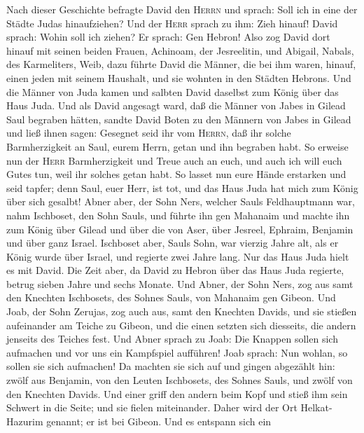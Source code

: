  Nach dieser Geschichte befragte David den \textsc{Herrn}
und sprach: Soll ich in eine der Städte Judas hinaufziehen? Und der
\textsc{Herr} sprach zu ihm: Zieh hinauf! David sprach: Wohin soll ich
ziehen? Er sprach: Gen Hebron!  Also zog David dort hinauf
mit seinen beiden Frauen, Achinoam, der Jesreelitin, und Abigail,
Nabals, des Karmeliters, Weib,  dazu führte David die
Männer, die bei ihm waren, hinauf, einen jeden mit seinem Haushalt, und
sie wohnten in den Städten Hebrons.  Und die Männer von
Juda kamen und salbten David daselbst zum König über das Haus Juda.
 Und als David angesagt ward, daß die Männer von Jabes in
Gilead Saul begraben hätten, sandte David Boten zu den Männern von Jabes
in Gilead und ließ ihnen sagen: Gesegnet seid ihr vom \textsc{Herrn},
daß ihr solche Barmherzigkeit an Saul, eurem Herrn, getan und ihn
begraben habt.  So erweise nun der \textsc{Herr}
Barmherzigkeit und Treue auch an euch, und auch ich will euch Gutes tun,
weil ihr solches getan habt.  So lasset nun eure Hände
erstarken und seid tapfer; denn Saul, euer Herr, ist tot, und das Haus
Juda hat mich zum König über sich gesalbt!  Abner aber,
der Sohn Ners, welcher Sauls Feldhauptmann war, nahm Ischboset, den Sohn
Sauls, und führte ihn gen Mahanaim  und machte ihn zum
König über Gilead und über die von Aser, über Jesreel, Ephraim, Benjamin
und über ganz Israel.  Ischboset aber, Sauls Sohn, war
vierzig Jahre alt, als er König wurde über Israel, und regierte zwei
Jahre lang. Nur das Haus Juda hielt es mit David.  Die
Zeit aber, da David zu Hebron über das Haus Juda regierte, betrug sieben
Jahre und sechs Monate.  Und Abner, der Sohn Ners, zog
aus samt den Knechten Ischbosets, des Sohnes Sauls, von Mahanaim gen
Gibeon.  Und Joab, der Sohn Zerujas, zog auch aus, samt
den Knechten Davids, und sie stießen aufeinander am Teiche zu Gibeon,
und die einen setzten sich diesseits, die andern jenseits des Teiches
fest.  Und Abner sprach zu Joab: Die Knappen sollen sich
aufmachen und vor uns ein Kampfspiel aufführen! Joab sprach: Nun wohlan,
so sollen sie sich aufmachen!  Da machten sie sich auf
und gingen abgezählt hin: zwölf aus Benjamin, von den Leuten Ischbosets,
des Sohnes Sauls, und zwölf von den Knechten Davids.  Und
einer griff den andern beim Kopf und stieß ihm sein Schwert in die
Seite; und sie fielen miteinander. Daher wird der Ort Helkat-Hazurim
genannt; er ist bei Gibeon.  Und es entspann sich ein
